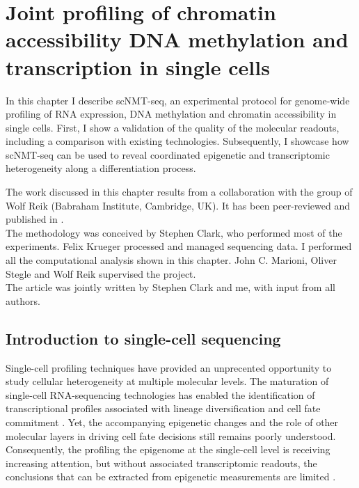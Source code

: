 \graphicspath{{Chapter1/Figs/}}

\chapter{Joint profiling of chromatin accessibility DNA methylation and transcription in single cells}

In this chapter I describe scNMT-seq, an experimental protocol for genome-wide profiling of RNA expression, DNA methylation and chromatin accessibility in single cells. First, I show a validation of the quality of the molecular readouts, including a comparison with existing technologies. Subsequently, I showcase how scNMT-seq can be used to reveal coordinated epigenetic and transcriptomic heterogeneity along a differentiation process.

The work discussed in this chapter results from a collaboration with the group of Wolf Reik (Babraham Institute, Cambridge, UK). It has been peer-reviewed and published in \cite{Clark2018}.\\
The methodology was conceived by Stephen Clark, who performed most of the experiments. Felix Krueger processed and managed sequencing data. I performed all the computational analysis shown in this chapter. John C. Marioni, Oliver Stegle and Wolf Reik supervised the project.\\
The article was jointly written by Stephen Clark and me, with input from all authors.

\section{Introduction to single-cell sequencing}

Single-cell profiling techniques have provided an unprecented opportunity to study cellular heterogeneity at multiple molecular levels. The maturation of single-cell RNA-sequencing technologies has enabled the identification of transcriptional profiles associated with lineage diversification and cell fate commitment \cite{Kolodziejczyk2015,Griffiths2018,Papalexi2017,Patel2014}. Yet, the accompanying epigenetic changes and the role of other molecular layers in driving cell fate decisions still remains poorly understood. Consequently, the profiling the epigenome at the single-cell level is receiving increasing attention, but without associated transcriptomic readouts, the conclusions that can be extracted from epigenetic measurements are limited \cite{Stuart2019,Kelsey2017,Griffiths2018}.

